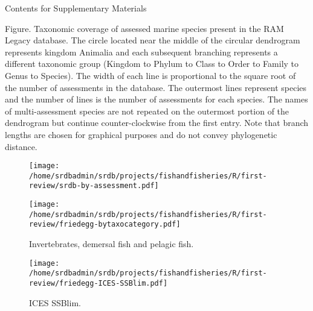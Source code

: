 \documentclass[letterpaper,review,authoryear,12pt]{myelsarticle}
\begin{document}
\begin{appendix}
Contents for Supplementary Materials



\begin{landscape}
\begin{tiny}

\end{tiny}
\end{landscape}

\noindent Figure. Taxonomic coverage of assessed marine species present in the
RAM Legacy database. The circle located near the middle of the circular
dendrogram represents kingdom Animalia and each subsequent branching
represents a different taxonomic group (Kingdom to Phylum to Class to
Order to Family to Genus to Species). The width of each line is
proportional to the square root of the number of assessments in the
database. The outermost lines represent species and the number of
lines is the number of assessments for each species. The names of
multi-assessment species are not repeated on the outermost portion of
the dendrogram but continue counter-clockwise from the first entry.
Note that branch lengths are chosen for graphical purposes and do not
convey phylogenetic distance.\\ 

\begin{figure}
\begin{center}
\texttt{[image: /home/srdbadmin/srdb/projects/fishandfisheries/R/first-review/srdb-by-assessment.pdf]} %
\end{center}
\caption{ }\label{fig:taxo:srdb}
\end{figure}

\begin{figure}
\begin{center}
\texttt{[image: /home/srdbadmin/srdb/projects/fishandfisheries/R/first-review/friedegg-bytaxocategory.pdf]}
\end{center}
\caption{Invertebrates, demersal fish and pelagic fish.}
\label{fig:group}
\end{figure}

\begin{figure}
\begin{center}
\texttt{[image: /home/srdbadmin/srdb/projects/fishandfisheries/R/first-review/friedegg-ICES-SSBlim.pdf]}
\end{center}
\caption{ ICES SSBlim.}
\label{fig:icesblim}
\end{figure}


\end{appendix}
\end{document}
